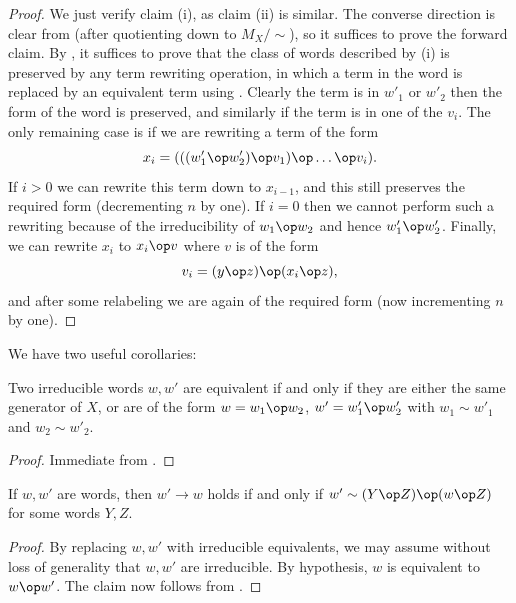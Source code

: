 \begin{proof}  We just verify claim (i), as claim (ii) is similar.  The converse direction is clear from  (after quotienting down to $M_X/\sim$), so it suffices to prove the forward claim. By , it suffices to prove that the class of words described by (i) is preserved by any term rewriting operation, in which a term in the word is replaced by an equivalent term using .  Clearly the term is in $w'_1$ or $w'_2$ then the form of the word is preserved, and similarly if the term is in one of the $v_i$.  The only remaining case is if we are rewriting a term of the form
$$ x_i = (((w'_1 \op w'_2) \op v_1) \op \dots \op v_i).$$
If $i>0$ we can rewrite this term down to $x_{i-1}$, and this still preserves the required form (decrementing $n$ by one).  If $i=0$ then we cannot perform such a rewriting because of the irreducibility of $w_1 \op w_2$ and hence $w'_1 \op w'_2$.  Finally, we can rewrite $x_i$ to $x_i \op v$ where $v$ is of the form
$$ v_i = (y \op z) \op (x_i \op z),$$
and after some relabeling we are again of the required form (now incrementing $n$ by one).
\end{proof}

We have two useful corollaries:

\begin{corollary}\label{unique-factorization}\leanok{}  Two irreducible words $w, w'$ are equivalent if and only if they are either the same generator of $X$, or are of the form $w = w_1 \op w_2$, $w' = w'_1 \op w'_2$ with $w_1 \sim w'_1$ and $w_2 \sim w'_2$.
\end{corollary}

\begin{proof}\leanok  Immediate from .
\end{proof}

\begin{corollary}\label{graph-desc}  If $w,w'$ are words, then $w' \to w$ holds if and only if $w' \sim (Y \op Z) \op (w \op Z)$ for some words $Y,Z$.
\end{corollary}

\begin{proof}  By replacing $w,w'$ with irreducible equivalents, we may assume without loss of generality that $w,w'$ are irreducible.  By hypothesis, $w$ is equivalent to $w \op w'$.  The claim now follows from .
\end{proof}



